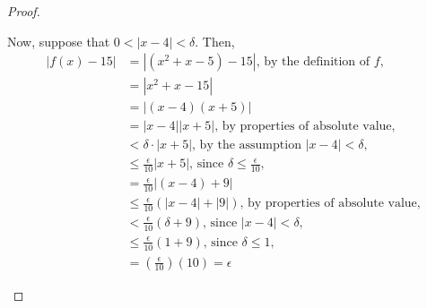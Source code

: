 \begin{enumerate}
\begin{proof}
\begin{multicols}{2}
Now, suppose that $0 < |x - 4| < \delta$.  Then,
\begin{align*} %
|f(x) - 15| & = |(x^2 + x - 5) - 15| \text{, by the definition of $f$,}\\ %
& = |x^2 + x - 15|\\
& = |(x - 4)(x + 5)|\\
& = |x - 4||x + 5| \text{, by properties of absolute value,}\\
& < \delta \cdot |x + 5| \text{, by the assumption $|x - 4| < \delta$,}\\
& \leq \frac{\epsilon}{10}|x + 5| \text{, since $\delta \leq \frac{\epsilon}{10}$,}\\
& = \frac{\epsilon}{10} |(x - 4) + 9|\\
& \leq \frac{\epsilon}{10}\left(|x - 4| + |9|\right) \text{, by properties of absolute value,}\\
& < \frac{\epsilon}{10}\left(\delta + 9\right) \text{, since $|x - 4| < \delta$,}\\
& \leq \frac{\epsilon}{10}(1 + 9) \text{, since $\delta \leq 1$,}\\
& = \left(\frac{\epsilon}{10}\right) (10) = \epsilon
\end{align*}

\columnbreak %


\end{multicols}
\end{proof}
\end{enumerate}
